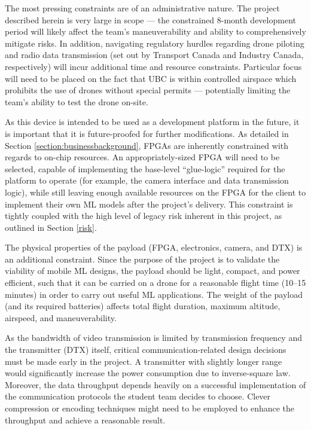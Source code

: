 The most pressing constraints are of an administrative nature. The project described
herein is very large in scope --- the constrained 8-month development period 
will likely affect the team's maneuverability and ability to comprehensively mitigate risks. 
In addition, navigating regulatory hurdles regarding drone piloting\cite{trans-canada} and radio data transmission\cite{indus-canada} (set out by 
Transport Canada and Industry Canada, respectively) will incur additional time and resource constraints. Particular focus will need to be placed on the fact that UBC is within controlled airspace\cite{map} which prohibits the use of drones without special permits --- potentially limiting the team's ability to test the drone on-site.

As this device is intended to be used as a development platform in the future, it is important that it is future-proofed for further modifications. As detailed in Section \ref{section:businessbackground}, FPGAs are
inherently constrained with regards to on-chip resources. An appropriately-sized FPGA will need to be selected, capable of
implementing the base-level ``glue-logic'' required for the platform to operate (for example, the camera interface and data transmission logic), while still
leaving enough available resources on the FPGA for the client to implement their own ML models after the project's delivery. 
This constraint is tightly coupled with the high level of legacy risk inherent in this project, as outlined in Section \ref{risk}.

The physical properties of the payload (FPGA, electronics, camera, and  DTX) is an additional constraint. Since the purpose of the project
is to validate the viability of mobile ML designs, the payload should be light, compact, and power efficient, such
that it can be carried on a drone for a reasonable flight time (10--15 minutes) in order to carry out useful ML applications.
The weight of the payload (and its required batteries) affects total flight duration, maximum altitude, airspeed, and maneuverability. 

As the bandwidth of video transmission is limited by transmission frequency and the transmitter (DTX) itself, 
critical communication-related design decisions must be made early in the project.
A transmitter with slightly longer range would significantly increase the power consumption due to inverse-square law.
Moreover, the data throughput depends heavily on a successful implementation of the communication
protocols the student team decides to choose. Clever compression or encoding techniques might need to be
employed to enhance the throughput and achieve a reasonable result.


